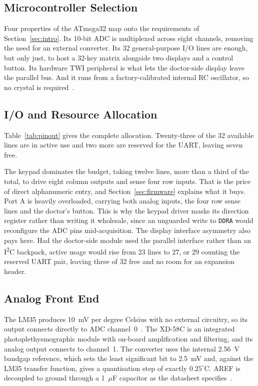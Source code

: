 \subsection{Microcontroller Selection}
Four properties of the ATmega32 map onto the requirements of Section~\ref{sec:intro}. Its 10-bit ADC
is multiplexed across eight channels, removing the need for an external converter. Its 32
general-purpose I/O lines are enough, but only just, to host a 32-key matrix alongside two displays
and a control button. Its hardware TWI peripheral is what lets the doctor-side display leave the
parallel bus. And it runs from a factory-calibrated internal RC oscillator, so no crystal is
required~\cite{microchip2020}.

\subsection{I/O and Resource Allocation}
Table~\ref{tab:pinout} gives the complete allocation. Twenty-three of the 32 available lines are in
active use and two more are reserved for the UART, leaving seven free.



The keypad dominates the budget, taking twelve lines, more than a third of the total, to drive eight
column outputs and sense four row inputs. That is the price of direct alphanumeric entry, and
Section~\ref{sec:firmware} explains what it buys. Port A is heavily overloaded, carrying both analog
inputs, the four row sense lines and the doctor's button. This is why the keypad driver masks its
direction register rather than writing it wholesale, since an unguarded write to \texttt{DDRA} would
reconfigure the ADC pins mid-acquisition. The display interface asymmetry also pays here. Had the
doctor-side module used the parallel interface rather than an I\textsuperscript{2}C backpack, active
usage would rise from 23 lines to 27, or 29 counting the reserved UART pair, leaving three of 32 free
and no room for an expansion header.

\subsection{Analog Front End}
The LM35 produces 10~mV per degree Celsius with no external circuitry, so its output connects
directly to ADC channel~0~\cite{ti2022}. The XD-58C is an integrated photoplethysmographic module
with on-board amplification and filtering, and its analog output connects to channel~1. The converter
uses the internal 2.56~V bandgap reference, which sets the least significant bit to 2.5~mV and,
against the LM35 transfer function, gives a quantisation step of exactly $0.25^{\circ}$C. AREF is
decoupled to ground through a 1~$\mu$F capacitor as the datasheet specifies~\cite{microchip2020}.

